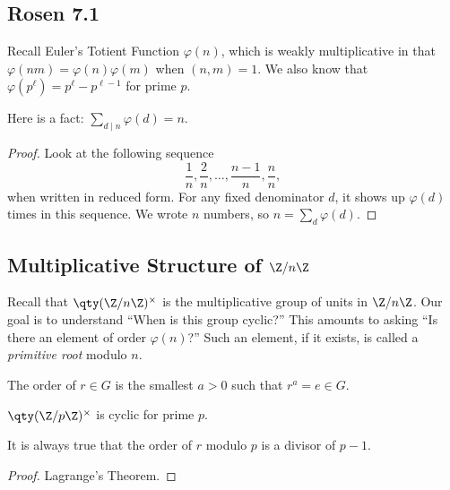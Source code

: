 \subsection{Rosen 7.1}

Recall Euler's Totient Function $\varphi(n)$, which is weakly multiplicative in that $\varphi(nm) =\varphi(n)\varphi(m)$ when $(n,m) = 1$. We also know that $\varphi(p^\ell) = p^\ell - p^{\ell - 1}$ for prime $p$.

Here is a fact: $\sum_{d \mid n} \varphi(d) = n$.

\begin{proof}
Look at the following sequence \[ \frac{1}{n}, \frac{2}{n}, \dotsc, \frac{n-1}{n}, \frac{n}{n}, \]
when written in reduced form. For any fixed denominator $d$, it shows up $\varphi(d)$ times in this sequence. We wrote $n$ numbers, so $n = \sum_d \varphi(d)$.
\end{proof}

\subsection{Multiplicative Structure of\/ \texorpdfstring{$\Z/n\Z$}{Z/nZ}}

Recall that $\qty(\Z/n\Z)^\times$ is the multiplicative group of units in $\Z/n\Z$. Our goal is to understand ``When is this group cyclic?'' This amounts to asking ``Is there an element of order $\varphi(n)$?'' Such an element, if it exists, is called a \emph{primitive root} modulo $n$.

\begin{definition}[Order]
The order of $r \in G$ is the smallest $a>0$ such that $r^a = e \in G$.
\end{definition}

\begin{theorem}
$\qty(\Z/p\Z)^\times$ is cyclic for prime $p$.
\end{theorem}

\begin{lemma}
It is always true that the order of $r$ modulo $p$ is a divisor of $p-1$.
\end{lemma}

\begin{proof}
Lagrange's Theorem.
\end{proof}